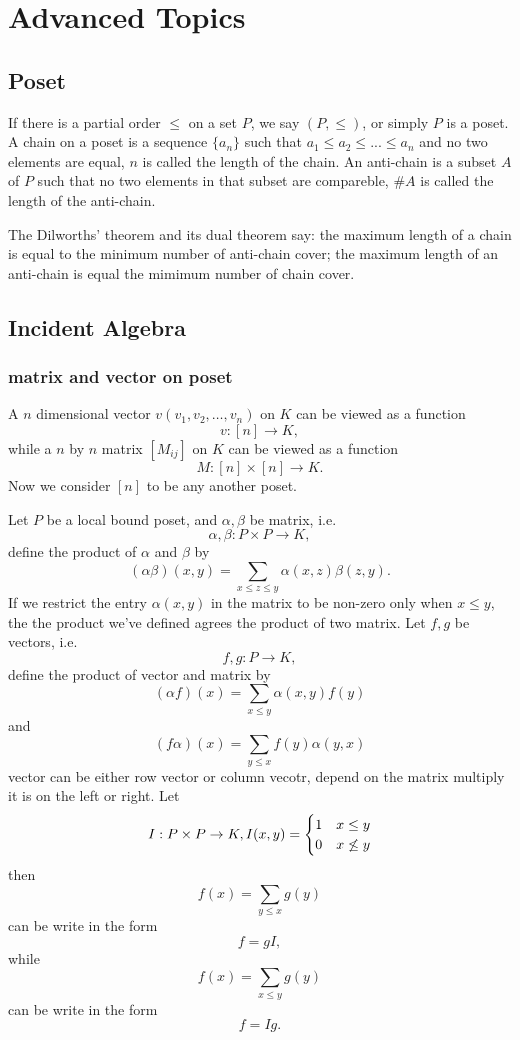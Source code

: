 \section{Advanced Topics}
\subsection{Poset}
If there is a partial order $\leq$ on a set $P$, we say $(P,\leq)$, or simply $P$ is a poset.
A chain on a poset is a sequence $\{a_n\}$ such that $a_1\leq a_2\leq...\leq a_n$ and no two elements are equal,
$n$ is called the length of the chain.
An anti-chain is a subset $A$ of $P$ such that no two elements in that subset are compareble,
$\#A$ is called the length of the anti-chain.

The Dilworths' theorem and its dual theorem say:
the maximum length of a chain is equal to the minimum number of anti-chain cover;
the maximum length of an anti-chain is equal the mimimum number of chain cover.

\subsection{Incident Algebra}
\subsubsection{matrix and vector on poset}
A $n$ dimensional vector $v(v_1 , v_2 , \dots , v_n)$ on $K$
can be viewed as a function $$v : [n] \to K,$$
while a $n$ by $n$ matrix $[M_{ij}]$ on $K$ can be viewed as
a function $$M : [n] \times [n] \to K.$$ Now we consider
$[n]$ to be any another poset.

Let $P$ be a local bound poset,
and $\alpha, \beta$ be matrix, i.e.
$$\alpha , \beta : P \times P \to K,$$
define the product of $\alpha$ and $\beta$ by
$$(\alpha \beta)(x , y) = \sum_{x \leq z \leq y} \alpha(x,z) \beta(z,y).$$
If we restrict the entry $\alpha(x,y)$ in the matrix
to be non-zero only when $x \leq y$, the the product
we've defined agrees the product of two matrix.
Let $f, g$ be vectors, i.e.
$$f , g : P \to K,$$
define the product of vector and matrix by
$$(\alpha f)(x) = \sum_{x \leq y} \alpha(x,y)f(y)$$
and
$$(f \alpha)(x) = \sum_{y \leq x} f(y)\alpha(y,x)$$
vector can be either row vector or column vecotr,
depend on the matrix multiply it is on the left or right.
Let $$I : P \times P \to K, I(x,y) = \begin{cases} 1 & x \leq y \cr 0 & x \not\leq y \end{cases}$$
then
$$f(x) = \sum_{y \leq x} g(y)$$
can be write in the form
$$f = gI,$$
while
$$f(x) = \sum_{x \leq y} g(y)$$
can be write in the form
$$f = Ig.$$

